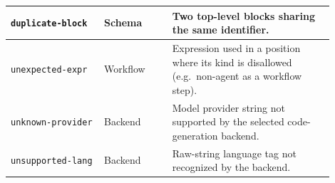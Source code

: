\documentclass[sigconf,nonacm]{acmart}
\begin{document}
\begin{table}[!ht]
\begin{tabular}{@{}p{0.26\linewidth}p{0.19\linewidth}p{0.45\linewidth}@{}}
    \texttt{duplicate-block}   & Schema        & Two top-level blocks sharing the same identifier. \\
    \midrule
    \texttt{unexpected-expr}   & Workflow      & Expression used in a position where its kind is disallowed (e.g.\ non-agent as a workflow step). \\
    \texttt{unknown-provider}  & Backend       & Model provider string not supported by the selected code-generation backend. \\
    \texttt{unsupported-lang}  & Backend       & Raw-string language tag not recognized by the backend. \\
    \bottomrule
  \end{tabular}
\end{table}
\end{document}
